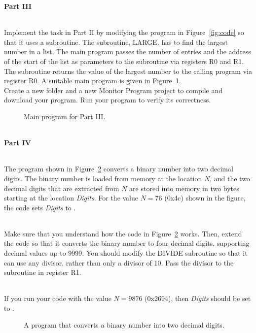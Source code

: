 \documentclass[epsfig,10pt,fullpage]{article}
\newcommand{\CommonDocsPath}{../../../../common/docs}
\begin{document}
\newpage
\noindent
{\bf Part III}

~\\
\noindent
Implement the task in Part II by modifying the program in Figure~\ref{fig:code} so that it
uses a subroutine. The subroutine, LARGE, has to find the largest number in a list.
The main program passes the number of entries and the address of the start of the
list as parameters to the subroutine via registers R0 and R1.
The subroutine returns the value of the largest number to the calling program
via register R0. A suitable main program is given in Figure~\ref{fig:main}.
~\\

\noindent
Create a new folder and a new Monitor Program project to compile and download your program.
Run your program to verify its correctness.

\begin{figure}[H]
\begin{center}

\end{center}
\caption{Main program for Part III.}
\label{fig:main}
\end{figure}

~\\
\noindent
{\bf Part IV}

~\\
\noindent
The program shown in Figure~\ref{fig:decimal} converts a binary number into two decimal digits.
The binary number is loaded from memory at the location $N$, and the two
decimal digits that are extracted from $N$ are stored into memory in two bytes starting at 
the location {\it Digits}. For the value $N = 76$ ({\sf 0x4c}) shown in the figure, the code sets 
{\it Digits} to {}.

~\\
\noindent
Make sure that you understand how the code in Figure~\ref{fig:decimal} works. Then, extend
the code so that it converts the binary number to four decimal digits, supporting decimal 
values up to 9999. You should modify the DIVIDE subroutine so that it can use any divisor, 
rather than only a divisor of 10. Pass the divisor to the subroutine in register R1.

~\\
\noindent
If you run your code with the value $N = 9876$ ({\sf 0x2694}), then {\it Digits} should be set to 
{}.

\begin{figure}[H]
\begin{center}

\end{center}
\caption{A program that converts a binary number into two decimal digits.}
\label{fig:decimal}
\end{figure}



\end{document}
